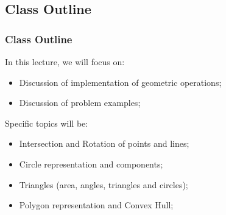 \subsection{Class Outline}
\begin{frame}
  \frametitle{Class Outline}
  In this lecture, we will focus on:
  \begin{itemize}
    \item Discussion of implementation of geometric operations;
    \item Discussion of problem examples;
  \end{itemize}\bigskip

  Specific topics will be:
  \begin{itemize}
    \item Intersection and Rotation of points and lines;\medskip
    \item Circle representation and components;\medskip
    \item Triangles (area, angles, triangles and circles);\medskip
    \item Polygon representation and Convex Hull;
  \end{itemize}\medskip
\end{frame}

